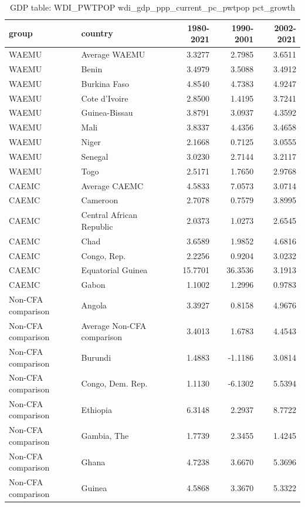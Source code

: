 \begin{table}

\caption{GDP table: WDI_PWTPOP wdi_gdp_ppp_current_pc_pwtpop pct_growth}
\centering
\begin{tabular}[t]{llrrr}
\toprule
group & country & 1980-2021 & 1990-2001 & 2002-2021\\
\midrule
WAEMU & Average WAEMU & 3.3277 & 2.7985 & 3.6511\\
WAEMU & Benin & 3.4979 & 3.5088 & 3.4912\\
WAEMU & Burkina Faso & 4.8540 & 4.7383 & 4.9247\\
WAEMU & Cote d'Ivoire & 2.8500 & 1.4195 & 3.7241\\
WAEMU & Guinea-Bissau & 3.8791 & 3.0937 & 4.3592\\
\addlinespace
WAEMU & Mali & 3.8337 & 4.4356 & 3.4658\\
WAEMU & Niger & 2.1668 & 0.7125 & 3.0555\\
WAEMU & Senegal & 3.0230 & 2.7144 & 3.2117\\
WAEMU & Togo & 2.5171 & 1.7650 & 2.9768\\
CAEMC & Average CAEMC & 4.5833 & 7.0573 & 3.0714\\
\addlinespace
CAEMC & Cameroon & 2.7078 & 0.7579 & 3.8995\\
CAEMC & Central African Republic & 2.0373 & 1.0273 & 2.6545\\
CAEMC & Chad & 3.6589 & 1.9852 & 4.6816\\
CAEMC & Congo, Rep. & 2.2256 & 0.9204 & 3.0232\\
CAEMC & Equatorial Guinea & 15.7701 & 36.3536 & 3.1913\\
\addlinespace
CAEMC & Gabon & 1.1002 & 1.2996 & 0.9783\\
Non-CFA comparison & Angola & 3.3927 & 0.8158 & 4.9676\\
Non-CFA comparison & Average Non-CFA comparison & 3.4013 & 1.6783 & 4.4543\\
Non-CFA comparison & Burundi & 1.4883 & -1.1186 & 3.0814\\
Non-CFA comparison & Congo, Dem. Rep. & 1.1130 & -6.1302 & 5.5394\\
\addlinespace
Non-CFA comparison & Ethiopia & 6.3148 & 2.2937 & 8.7722\\
Non-CFA comparison & Gambia, The & 1.7739 & 2.3455 & 1.4245\\
Non-CFA comparison & Ghana & 4.7238 & 3.6670 & 5.3696\\
Non-CFA comparison & Guinea & 4.5868 & 3.3670 & 5.3322\\

\end{tabular}
\end{table}
